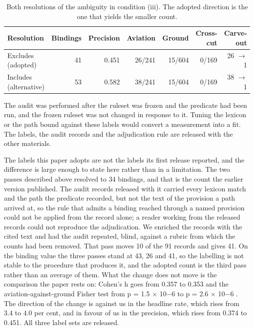 \begin{table}[!htb]
\centering
\caption{Both resolutions of the ambiguity in condition (iii). The adopted direction is the one that yields the smaller count.}
\label{tab:t3}
\small
\begin{tabular}{@{}lrrrrrr@{}}
\toprule
Resolution & Bindings & Precision & Aviation & Ground & Cross-cut & Carve-out \\
\midrule
Excludes (adopted) & 41 & 0.451 & 26/241 & 15/604 & 0/169 & 26 $\rightarrow$ 1 \\
Includes (alternative) & 53 & 0.582 & 38/241 & 15/604 & 0/169 & 38 $\rightarrow$ 1 \\
\bottomrule
\end{tabular}
\end{table}

The audit was performed after the ruleset was frozen and the predicate had been run, and the frozen ruleset was not changed in response to it. Tuning the lexicon or the path bound against these labels would convert a measurement into a fit. The labels, the audit records and the adjudication rule are released with the other materials.

The labels this paper adopts are not the labels its first release reported, and the difference is large enough to state here rather than in a limitation. The two passes described above resolved to 34 bindings, and that is the count the earlier version published. The audit records released with it carried every lexicon match and the path the predicate recorded, but not the text of the provision a path arrived at, so the rule that admits a binding reached through a named provision could not be applied from the record alone; a reader working from the released records could not reproduce the adjudication. We enriched the records with the cited text and had the audit repeated, blind, against a rubric from which the counts had been removed. That pass moves 10 of the 91 records and gives 41. On the binding value the three passes stand at 43, 26 and 41, so the labelling is not stable to the procedure that produces it, and the adopted count is the third pass rather than an average of them. What the change does not move is the comparison the paper rests on: Cohen's h goes from 0.357 to 0.353 and the aviation-against-ground Fisher test from p = 1.5 $\times$ 10$-$6 to p = 2.6 $\times$ 10$-$6 . The direction of the change is against us in the headline rate, which rises from 3.4 to 4.0 per cent, and in favour of us in the precision, which rises from 0.374 to 0.451. All three label sets are released.

